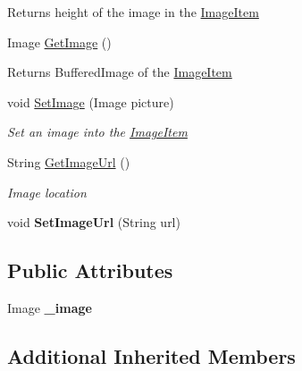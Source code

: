 \begin{DoxyCompactItemize}
\begin{DoxyCompactList}
\begin{DoxyReturn}{Returns}
height of the image in the \mbox{\hyperlink{class_space_v_i_l_1_1_image_item}{Image\+Item}} 
\end{DoxyReturn}
\end{DoxyCompactList}\item 
\mbox{\label{class_space_v_i_l_1_1_image_item_a2bc43b924f977bc39e61bf1461b7fb83}} 
Image \mbox{\hyperlink{class_space_v_i_l_1_1_image_item_a2bc43b924f977bc39e61bf1461b7fb83}{Get\+Image}} ()
\begin{DoxyCompactList}\small\item\em \begin{DoxyReturn}{Returns}
Buffered\+Image of the \mbox{\hyperlink{class_space_v_i_l_1_1_image_item}{Image\+Item}} 
\end{DoxyReturn}
\end{DoxyCompactList}\item 
void \mbox{\hyperlink{class_space_v_i_l_1_1_image_item_ae62563d3131e913b37293731fa535205}{Set\+Image}} (Image picture)
\begin{DoxyCompactList}\small\item\em Set an image into the \mbox{\hyperlink{class_space_v_i_l_1_1_image_item}{Image\+Item}} \end{DoxyCompactList}\item 
String \mbox{\hyperlink{class_space_v_i_l_1_1_image_item_a9da0616d71482cc74d16e83ea00913af}{Get\+Image\+Url}} ()
\begin{DoxyCompactList}\small\item\em Image location \end{DoxyCompactList}\item 
\mbox{\label{class_space_v_i_l_1_1_image_item_ad73bdbad08bb6637dc55363cdddb470e}} 
void {\bfseries Set\+Image\+Url} (String url)
\end{DoxyCompactItemize}
\subsection*{Public Attributes}
\begin{DoxyCompactItemize}
\item 
\mbox{\label{class_space_v_i_l_1_1_image_item_aaecac14f8ec98844d7b642dd13073e5d}} 
Image {\bfseries \+\_\+image}
\end{DoxyCompactItemize}
\subsection*{Additional Inherited Members}


